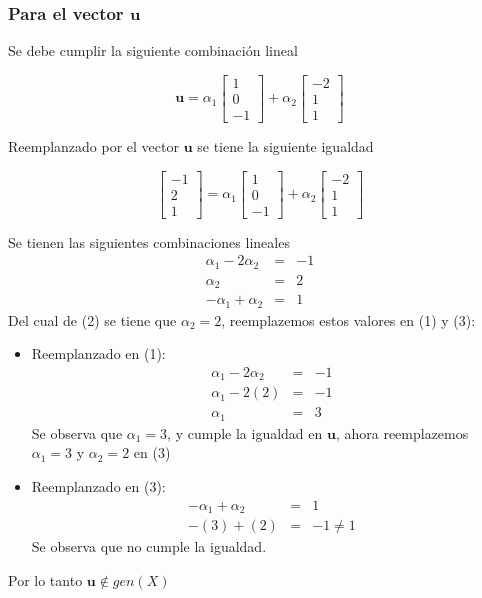 \subsubsection{Para el vector $\mathbf{u}$}
Se debe cumplir la siguiente combinación lineal

\[
\mathbf{u} = {\alpha}_{1}
\begin{bmatrix}
1 \\ 
0 \\ 
-1
\end{bmatrix}
+ {\alpha}_{2}
\begin{bmatrix}
-2 \\ 
1 \\ 
1
\end{bmatrix}
\]

Reemplanzado por el vector $\mathbf{u}$ se tiene la siguiente igualdad

\[
\begin{bmatrix}
-1 \\ 
2 \\ 
1
\end{bmatrix}
= {\alpha}_{1}
\begin{bmatrix}
1 \\ 
0 \\ 
-1
\end{bmatrix}
+ {\alpha}_{2}
\begin{bmatrix}
-2 \\ 
1 \\ 
1
\end{bmatrix}
\]

Se tienen las siguientes combinaciones lineales
\begin{eqnarray}
    {\alpha}_{1} - 2 {\alpha}_{2} &=& -1 \\
    {\alpha}_{2} &=& 2 \\
    -{\alpha}_{1} + {\alpha}_{2} &=& 1
\end{eqnarray}
Del cual de (2) se tiene que $\alpha_2 = 2$, reemplazemos estos valores en (1) y (3):
\begin{itemize}
     \item Reemplanzado en (1):
     \begin{eqnarray}
         {\alpha}_{1} - 2 {\alpha}_{2} &=& -1 \nonumber \\
         {\alpha}_{1} - 2 (2) &=& -1 \nonumber \\
         {\alpha}_{1} &=& 3 \nonumber
     \end{eqnarray}
     Se observa que ${\alpha}_{1} = 3$, y cumple la igualdad en $\mathbf{u}$, ahora reemplazemos ${\alpha}_{1} = 3$ y ${\alpha}_{2} = 2$ en (3) 
     \item Reemplanzado en (3):
     \begin{eqnarray}
         -{\alpha}_{1} + {\alpha}_{2} &=& 1 \nonumber \\
         -(3) + (2) &=& -1 \neq 1 \nonumber
     \end{eqnarray}
     Se observa que no cumple la igualdad.
 \end{itemize} 
Por lo tanto $\mathbf{u} \notin gen(X)$

